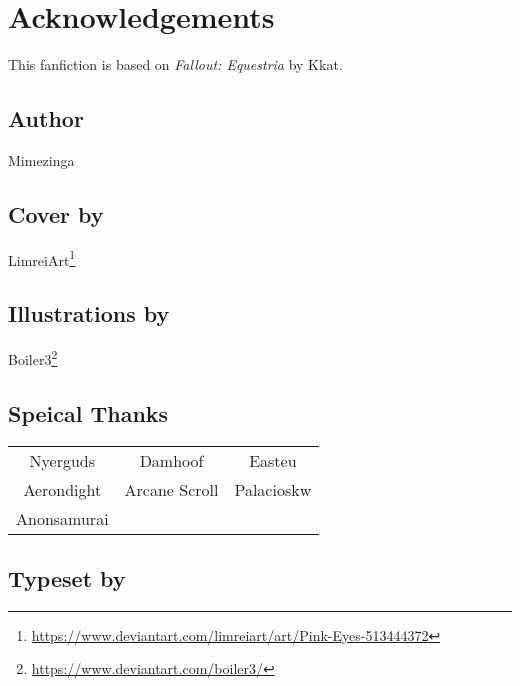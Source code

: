 \chapter{Acknowledgements}

\begin{center}
    This fanfiction is based on \emph{Fallout: Equestria} by Kkat.    
\end{center}

\section*{Author}

\begin{center}
    Mimezinga
\end{center}

\section*{Cover by}

\begin{center}
    LimreiArt\footnote{\url{https://www.deviantart.com/limreiart/art/Pink-Eyes-513444372}}
\end{center}

\section*{Illustrations by}

\begin{center}
    Boiler3\footnote{\url{https://www.deviantart.com/boiler3/}}
\end{center}

\section*{Speical Thanks}

\begin{table}[ht!]
    \centering
    \begin{tabular}{ccc}
        Nyerguds & Damhoof & Easteu \\
        Aerondight & Arcane Scroll & Palacioskw \\
        Anonsamurai & & \\
    \end{tabular}
\end{table}

\section*{Typeset by}

